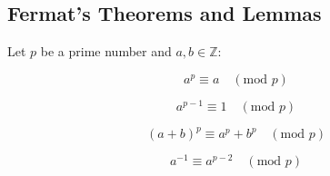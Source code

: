 \subsection{Fermat's Theorems and Lemmas}

Let $p$ be a prime number and $a, b \in \mathbb{Z}$:

\begin{equation}
a^p \equiv a \quad (\text{mod } p)
\end{equation}

\begin{equation}
a^{p-1} \equiv 1 \quad (\text{mod } p)
\end{equation}

\begin{equation}
  (a+b)^{p} \equiv a^{p} + b^{p} \quad (\text{mod } p)
\end{equation}

\begin{equation}
  a^{-1} \equiv a^{p-2} \quad (\text{mod } p)
\end{equation}


